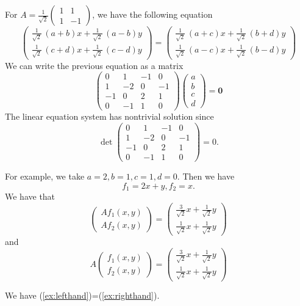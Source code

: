 \documentclass[10pt,a4paper]{article}
\begin{document}
For $A = \frac{1}{\sqrt{2}} \left(
\begin{array}{rr}
1 & 1\\1& -1
\end{array}\right)$,
we have the following equation
\[
\left(
\begin{array}{rr}
\frac{1}{\sqrt{2}} \, {\left(a +  b\right)} x + \frac{1}{\sqrt{2}} \, {\left(a - b\right)} y \\
\frac{1}{\sqrt{2}} \, {\left( c + d\right)} x + \frac{1}{\sqrt{2}} \, {\left( c - d\right)} y
\end{array}
\right)
=
\left(
\begin{array}{rr}
\frac{1}{\sqrt{2}} \, {\left(a +  c\right)} x + \frac{1}{\sqrt{2}} \, {\left(b + d\right)} y \\
\frac{1}{\sqrt{2}} \, {\left( a -  c\right)} x + \frac{1}{\sqrt{2}} \, {\left( b -  d\right)} y
\end{array}
\right)
\]
We can write the previous equation as a matrix
\[
\left(
\begin{array}{rrrr}
0 & 1 & -1 & 0 \\
1 & -2 & 0 & -1 \\
-1 & 0 & 2 & 1 \\
0 & -1 & 1 & 0 
\end{array}
\right)
\begin{pmatrix}
a \\ b \\ c \\ d
\end{pmatrix} = \mathbf{0}
\]
The linear equation system has nontrivial solution since 
\[
\det 
\left(
\begin{array}{rrrr}
0 & 1 & -1 & 0 \\
1 & -2 & 0 & -1 \\
-1 & 0 & 2 & 1 \\
0 & -1 & 1 & 0 
\end{array}
\right) = 0.
\]

For example,
we take $a=2, b= 1, c = 1, d=0$.
Then we have
\[
f_1 = 2x + y, f_2 = x.
\]
We have that
\begin{equation} \label{ex:lefthand}
\left(
\begin{array}{cc}
A f_1 (x,y) \\
A f_2 (x,y)
\end{array}
\right)
=
\left(
\begin{array}{rr}
\frac{3}{\sqrt{2}}x + \frac{1}{\sqrt{2}}y \\
\frac{1}{\sqrt{2}} x + \frac{1}{\sqrt{2}} y
\end{array}
\right)
\end{equation}
and
\begin{equation} \label{ex:righthand}
A \left(
\begin{array}{cc}
f_1 (x,y) \\
f_2 (x,y)
\end{array}
\right)
=
\left(
\begin{array}{rr}
\frac{3}{\sqrt{2}} x + \frac{1}{\sqrt{2}} y \\
\frac{1}{\sqrt{2}}x + \frac{1}{\sqrt{2}} y
\end{array}
\right)
\end{equation}

We have (\ref{ex:lefthand})=(\ref{ex:righthand}).
\end{document}
